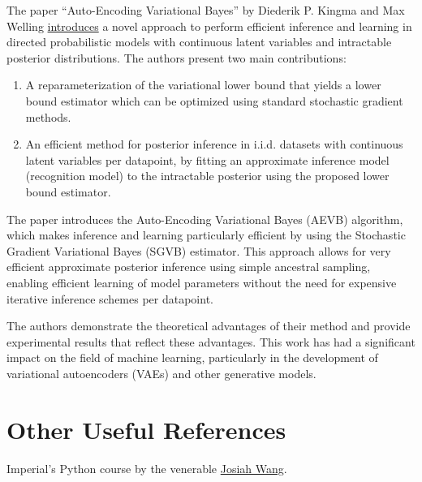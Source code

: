 \documentclass{article}
\begin{document}
The paper ``Auto-Encoding Variational Bayes'' by Diederik P. Kingma and Max Welling \href{https://arxiv.org/abs/1312.6114}{introduces} a novel approach to perform efficient inference and learning in directed probabilistic models with continuous latent variables and intractable posterior distributions.\cite{Kingma2013} The authors present two main contributions:
\begin{enumerate}
    \item A reparameterization of the variational lower bound that yields a lower bound estimator which can be optimized using standard stochastic gradient methods.
    \item An efficient method for posterior inference in i.i.d. datasets with continuous latent variables per datapoint, by fitting an approximate inference model (recognition model) to the intractable posterior using the proposed lower bound estimator.
\end{enumerate}

The paper introduces the Auto-Encoding Variational Bayes (AEVB) algorithm, which makes inference and learning particularly efficient by using the Stochastic Gradient Variational Bayes (SGVB) estimator. This approach allows for very efficient approximate posterior inference using simple ancestral sampling, enabling efficient learning of model parameters without the need for expensive iterative inference schemes per datapoint.

The authors demonstrate the theoretical advantages of their method and provide experimental results that reflect these advantages. This work has had a significant impact on the field of machine learning, particularly in the development of variational autoencoders (VAEs) and other generative models.

\section{Other Useful References}

Imperial's Python course by the venerable \href{https://python.pages.doc.ic.ac.uk/}{Josiah Wang}.

\clearpage


\end{document}
